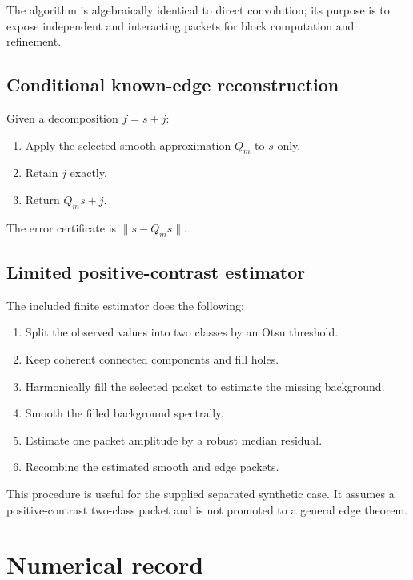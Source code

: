 \documentclass[11pt,letterpaper]{article}
\theoremstyle{plain}
\theoremstyle{plain}
\theoremstyle{plain}
\theoremstyle{definition}
\theoremstyle{definition}
\theoremstyle{definition}
\theoremstyle{definition}
\theoremstyle{remark}
\theoremstyle{remark}
\theoremstyle{remark}
\theoremstyle{remark}
\begin{document}
The algorithm is algebraically identical to direct convolution; its purpose is to expose independent and interacting packets for block computation and refinement.

\subsection{Conditional known-edge reconstruction}

Given a decomposition $f=s+j$:

\begin{enumerate}
\item Apply the selected smooth approximation $Q_m$ to $s$ only.
\item Retain $j$ exactly.
\item Return $Q_ms+j$.
\end{enumerate}

The error certificate is $\|s-Q_ms\|$.

\subsection{Limited positive-contrast estimator}

The included finite estimator does the following:

\begin{enumerate}
\item Split the observed values into two classes by an Otsu threshold.
\item Keep coherent connected components and fill holes.
\item Harmonically fill the selected packet to estimate the missing background.
\item Smooth the filled background spectrally.
\item Estimate one packet amplitude by a robust median residual.
\item Recombine the estimated smooth and edge packets.
\end{enumerate}

This procedure is useful for the supplied separated synthetic case. It assumes a positive-contrast two-class packet and is not promoted to a general edge theorem.

\section{Numerical record}\label{core:section:19}
\end{document}
